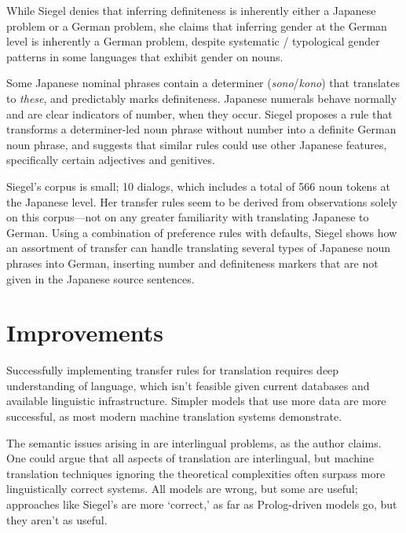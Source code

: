 \documentclass[11pt]{article}
\begin{document}
While Siegel denies that inferring definiteness is inherently either a Japanese problem or a German problem, she claims that inferring gender at the German level is inherently a German problem, despite systematic / typological gender patterns in some languages that exhibit gender on nouns.

Some Japanese nominal phrases contain a determiner (\emph{sono}/\emph{kono}) that translates to \emph{these}, and predictably marks definiteness. Japanese numerals behave normally and are clear indicators of number, when they occur. Siegel proposes a rule that transforms a determiner-led noun phrase without number into a definite German noun phrase, and suggests that similar rules could use other Japanese features, specifically certain adjectives and genitives.

Siegel's corpus is small; 10 dialogs, which includes a total of 566 noun tokens at the Japanese level. Her transfer rules seem to be derived from observations solely on this corpus---not on any greater familiarity with translating Japanese to German.
Using a combination of preference rules with defaults, Siegel shows how an assortment of transfer can handle translating several types of Japanese noun phrases into German, inserting number and definiteness markers that are not given in the Japanese source sentences.



\pagebreak
\section{Improvements}

Successfully implementing transfer rules for translation requires deep understanding of language, which isn't feasible given current databases and available linguistic infrastructure. Simpler models that use more data are more successful, as most modern machine translation systems demonstrate.

The semantic issues arising in \citet{siegel:1996} are interlingual problems, as the author claims. One could argue that all aspects of translation are interlingual, but machine translation techniques ignoring the theoretical complexities often surpass more linguistically correct systems.
All models are wrong, but some are useful; approaches like Siegel's are more `correct,' as far as Prolog-driven models go, but they aren't as useful.
\end{document}
